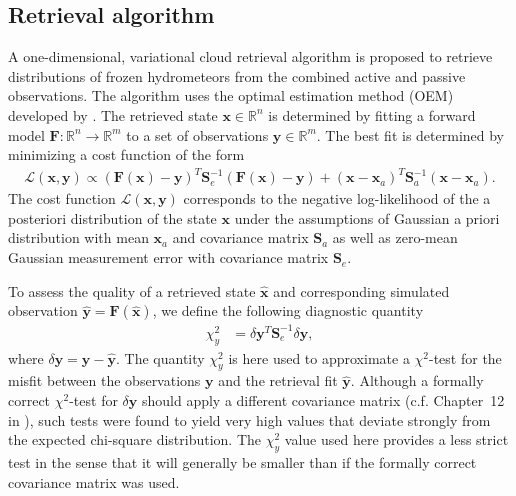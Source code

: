 \documentclass[journal abbreviation, manuscript]{copernicus}
\begin{document}
\subsection{Retrieval algorithm}
\label{sec:orgb528563}

A one-dimensional, variational cloud retrieval algorithm is proposed to
retrieve distributions of frozen hydrometeors from the combined active and
passive observations. The algorithm uses the optimal estimation method (OEM)
developed by \cite{rodgers00}. The retrieved state $\mathbf{x} \in
   \mathbb{R}^n$ is determined by fitting a forward model $\mathbf{F} : \mathbb{R}^n
   \rightarrow \mathbb{R}^m$ to a set of observations $\mathbf{y} \in
   \mathbb{R}^m$. The best fit is determined by minimizing a cost function of
the form
\begin{align}
\mathcal{L}(\mathbf{x}, \mathbf{y}) \propto
 \left(\mathbf{F}(\mathbf{x}) - \mathbf{y} \right )^T
  \mathbf{S}_e^{-1} 
  \left ( \mathbf{F}(\mathbf{x}) - \mathbf{y} \right)
+ \left ( \mathbf{x} - \mathbf{x}_a \right )^T
 \mathbf{S}^{-1}_a 
 \left ( \mathbf{x} - \mathbf{x}_a \right ).
\end{align}
%
The cost function $\mathcal{L}(\mathbf{x}, \mathbf{y})$ corresponds to the negative
log-likelihood of the a posteriori distribution of the state $\mathbf{x}$ under
the assumptions of Gaussian a priori distribution with mean $\mathbf{x}_a$ and
covariance matrix $\mathbf{S}_a$ as well as zero-mean Gaussian measurement error
with covariance matrix $\mathbf{S}_e$.

To assess the quality of a retrieved state $\hat{\mathbf{x}}$ and corresponding simulated
observation $\hat{\mathbf{y}} = \mathbf{F}(\hat{\mathbf{x}})$, we define the following diagnostic
quantity
\begin{align}
\chi^2_y &= \delta \mathbf{y}^T
  \mathbf{S}_e^{-1} 
  \delta \mathbf{y},
\end{align}
where $\delta \mathbf{y} = \mathbf{y} - \hat{\mathbf{y}}$. The quantity
$\chi^2_y$ is here used to approximate a $\chi^2$-test for the misfit between
the observations $\mathbf{y}$ and the retrieval fit $\hat{\mathbf{y}}$. Although
a formally correct $\chi^2$-test for $\delta\mathbf{y}$ should apply a different
covariance matrix (c.f. Chapter~12 in \cite{rodgers00}), such tests were found
to yield very high values that deviate strongly from the expected chi-square
distribution. The $\chi^2_y$ value used here provides a less strict test in the
sense that it will generally be smaller than if the formally correct covariance
matrix was used.
\end{document}
